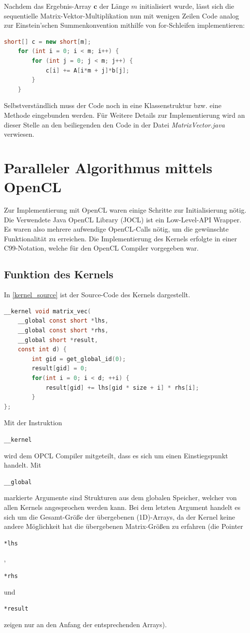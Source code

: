 \documentclass[
	ngerman,
	ruledheaders=section,
	class=report,
	thesis={type=Dokumentation},
	ignore-missing-data=true,
	accentcolor=9c,
	custommargins=false,
	marginpar=false,
	parskip=half-,
	fontsize=11pt,
]{tudapub}
\let\code\texttt
\def\code#1{\begin{small}\texttt{#1}\end{small}}
\begin{document}
Nachdem das Ergebnis-Array $\mathbf{c}$ der Länge $m$ initialisiert wurde, lässt sich die sequentielle Matrix-Vektor-Multiplikation nun mit wenigen Zeilen Code analog zur Einstein'schen Summenkonvention mithilfe von for-Schleifen implementieren:
\begin{lstlisting}[language=java]
	short[] c = new short[m];
	for (int i = 0; i < m; i++) {
		for (int j = 0; j < m; j++) {
			c[i] += A[i*m + j]*b[j];
		}
	}
\end{lstlisting}
Selbstverständlich muss der Code noch in eine Klassenstruktur bzw. eine Methode eingebunden werden. Für Weitere Details zur Implementierung wird an dieser Stelle an den beiliegenden den Code in der Datei \textit{MatrixVector.java} verwiesen.

\chapter{Paralleler Algorithmus mittels OpenCL}

Zur Implementierung mit OpenCL waren einige Schritte zur Initialisierung nötig. Die Verwendete Java OpenCL Library (JOCL) ist ein Low-Level-API Wrapper. Es waren also mehrere aufwendige OpenCL-Calls nötig, um die gewünschte Funktionalität zu erreichen. Die Implementierung des Kernels erfolgte in einer C99-Notation, welche für den OpenCL Compiler vorgegeben war.

\section{Funktion des Kernels}
In \ref{kernel_source} ist der Source-Code des Kernels dargestellt.
\begin{lstlisting}[language=c,label=kernel_source]
__kernel void matrix_vec(
	__global const short *lhs, 
	__global const short *rhs, 
	__global short *result, 
	const int d) {
		int gid = get_global_id(0);
		result[gid] = 0;		
		for(int i = 0; i < d; ++i) {
			result[gid] += lhs[gid * size + i] * rhs[i];
		}
};
\end{lstlisting}
Mit der Instruktion \code{\_\_kernel} wird dem OPCL Compiler mitgeteilt, dass es sich um einen Einstiegspunkt handelt. Mit \code{\_\_global} markierte Argumente sind Strukturen aus dem globalen Speicher, welcher von allen Kernels angesprochen werden kann. Bei dem letzten Argument handelt es sich um die Gesamt-Größe der übergebenen (1D)-Arrays, da der Kernel keine andere Möglichkeit hat die übergebenen Matrix-Größen zu erfahren (die Pointer \code{*lhs}, \code{*rhs} und \code{*result} zeigen nur an den Anfang der entsprechenden Arrays).
\end{document}

